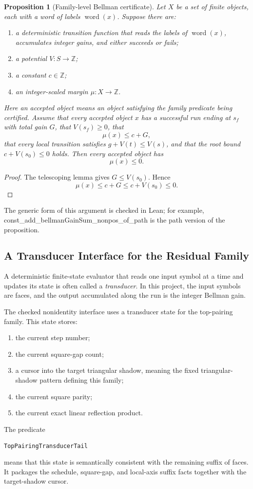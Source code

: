 \documentclass[11pt]{article}
\newtheorem{proposition}[theorem]{Proposition}
\newcommand{\Z}{\mathbb{Z}}
\newcommand{\word}{\operatorname{word}}
\newcommand{\leanref}[1]{{\small\ttfamily #1}}
\begin{document}
\begin{proposition}[Family-level Bellman certificate]
Let \(X\) be a set of finite objects, each with a word of labels
\(\word(x)\).  Suppose there are:
\begin{enumerate}[leftmargin=2em]
\item a deterministic transition function that reads the labels of
  \(\word(x)\), accumulates integer gains, and either succeeds or fails;
\item a potential \(V:S\to\Z\);
\item a constant \(c\in\Z\);
\item an integer-scaled margin \(\mu:X\to\Z\).
\end{enumerate}
Here an \emph{accepted} object means an object satisfying the family
predicate being certified.  Assume that every accepted object \(x\) has a
successful run ending at \(s_f\) with total gain \(G\), that \(V(s_f)\ge0\),
that
\[
  \mu(x)\le c+G,
\]
that every local transition satisfies \(g+V(t)\le V(s)\), and that the root
bound \(c+V(s_0)\le0\) holds.  Then every accepted object has
\[
  \mu(x)\le0.
\]
\end{proposition}

\begin{proof}
The telescoping lemma gives \(G\le V(s_0)\).  Hence
\[
  \mu(x)\le c+G\le c+V(s_0)\le0.
\]
\end{proof}

The generic form of this argument is checked in Lean; for example,
\leanref{const\_add\_bellmanGainSum\_nonpos\_of\_path} is the path version of
the proposition.

\subsection{A Transducer Interface for the Residual Family}

A deterministic finite-state evaluator that reads one input symbol at a time
and updates its state is often called a \emph{transducer}.  In this project,
the input symbols are faces, and the output accumulated along the run is the
integer Bellman gain.

The checked nonidentity interface uses a transducer state for the
top-pairing family.  This state stores:
\begin{enumerate}[leftmargin=2em]
\item the current step number;
\item the current square-gap count;
\item a cursor into the target triangular shadow, meaning the fixed
  triangular-shadow pattern defining this family;
\item the current square parity;
\item the current exact linear reflection product.
\end{enumerate}
The predicate
\begin{center}
  \texttt{TopPairingTransducerTail}
\end{center}
means that this state is semantically consistent with the remaining suffix of
faces.  It packages the schedule, square-gap, and local-axis suffix facts
together with the target-shadow cursor.
\end{document}

